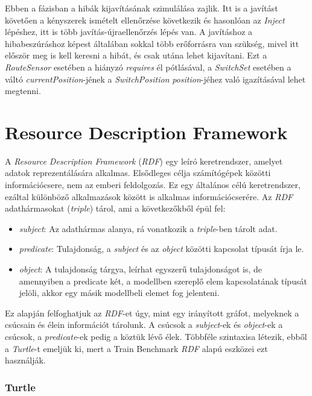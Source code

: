 Ebben a fázisban a hibák kijavításának szimulálása zajlik. Itt is a javítást követően a kényszerek ismételt ellenőrzése következik és hasonlóan az \emph{Inject} lépéshez, itt is több javítás-újraellenőrzés lépés van. A javításhoz a hibabeszúráshoz képest általában sokkal több erőforrásra van szükség, mivel itt először meg is kell keresni a hibát, és csak utána lehet kijavítani. Ezt a \emph{RouteSensor} esetében  a hiányzó \emph{requires} él pótlásával, a \emph{SwitchSet} esetében a váltó \emph{currentPosition}-jének a \emph{SwitchPosition} \emph{position}-jéhez való igazításával lehet megtenni.

\section{Resource Description Framework}

A \emph{Resource Description Framework} (\emph{RDF}) egy leíró keretrendszer, amelyet adatok reprezentálására alkalmas.\cite{Wood:14:RCA} Elsődleges célja számítógépek közötti információcsere, nem az emberi feldolgozás. Ez egy általános célú keretrendszer, ezáltal különböző alkalmazások között is alkalmas információcserére. Az \emph{RDF} adathármasokat (\emph{triple}) tárol, ami a következőkből épül fel:
\begin{itemize}
	\item \emph{subject}: Az adathármas alanya, rá vonatkozik a \emph{triple}-ben tárolt adat.
	\item \emph{predicate}: Tulajdonság, a \emph{subject} és az \emph{object} közötti kapcsolat típusát írja le.
	\item \emph{object}: A tulajdonság tárgya, leírhat egyszerű tulajdonságot is, de amennyiben a predicate két, a modellben szereplő elem kapcsolatának típusát jelöli, akkor egy másik modellbeli elemet fog jelenteni.
\end{itemize}

Ez alapján felfoghatjuk az \emph{RDF}-et úgy, mint egy irányított gráfot, melyeknek a csúcsain és élein információt tárolunk. A csúcsok a \emph{subject}-ek és \emph{object}-ek a csúcsok, a \emph{predicate}-ek pedig a köztük lévő élek. Többféle szintaxisa létezik, ebből a \emph{Turtle}-t emeljük ki, mert a Train Benchmark \emph{RDF} alapú eszközei ezt használják.

\subsubsection{Turtle}

